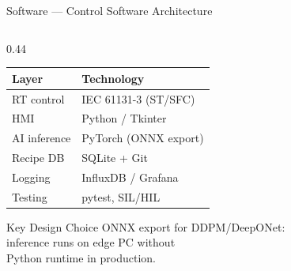\documentclass[aspectratio=169,11pt]{beamer}
\begin{document}
\begin{frame}[shrink=10]{Software --- Control Software Architecture}
\begin{columns}[T]
\begin{column}{0.44\textwidth}
      \vspace{0.4em}
      \begin{tabular}{ll}
        \toprule
        Layer       & Technology \\
        \midrule
        RT control  & IEC 61131-3 (ST/SFC) \\
        HMI         & Python / Tkinter \\
        AI inference& PyTorch (ONNX export) \\
        Recipe DB   & SQLite + Git \\
        Logging     & InfluxDB / Grafana \\
        Testing     & pytest, SIL/HIL \\
        \bottomrule
      \end{tabular}

      \vspace{0.8em}
      \begin{block}{\small Key Design Choice}
        \small
        ONNX export for DDPM/DeepONet:\\
        inference runs on edge PC without\\
        Python runtime in production.
      \end{block}
    \end{column}
  \end{columns}
\end{frame}
\end{document}
